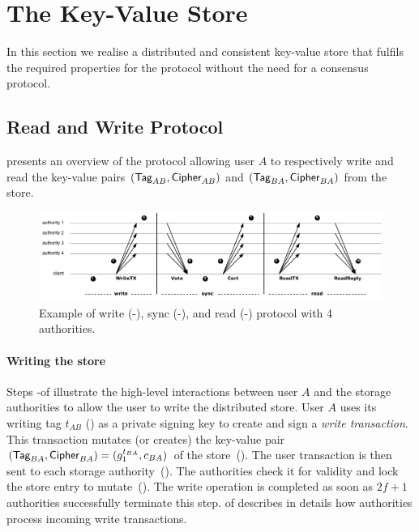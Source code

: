 \section{The \sysname Key-Value Store}
\label{sec:store}

In this section we realise a distributed and consistent key-value store that fulfils the required properties for the \sysname protocol without the need for a consensus protocol.


\subsection{Read and Write Protocol} \label{sec:read-write}
 presents an overview of the protocol allowing user $A$ to respectively write and read the key-value pairs $(\textsf{Tag}_{AB}, \textsf{Cipher}_{AB})$ and $(\textsf{Tag}_{BA}, \textsf{Cipher}_{BA})$ from the store.

\begin{figure}[t]
    \includegraphics[width=\textwidth]{figures/arke-store.drawio.pdf}
    \caption{Example of \sysname write (\one-\three), sync (\four-\seven), and read (\eight-\ten) protocol with 4 authorities.}
    \Description{}
    \label{fig:arke-store}
\end{figure}

\paragraph{Writing the store}
Steps \one-\three of  illustrate the high-level interactions between user $A$ and the storage authorities to allow the user to write the distributed store.
%
User $A$ uses its writing tag $t_{AB}$ () as a private signing key to create and sign a \emph{write transaction}. This transaction mutates (or creates) the key-value pair $(\textsf{Tag}_{BA}, \textsf{Cipher}_{BA}) = (g_1^{t_{BA}}, c_{BA})$ of the \sysname store~(\one).
%
The user transaction is then sent to each \sysname storage authority~(\two).
%
The authorities check it for validity and lock the store entry to mutate~(\three). The write operation is completed as soon as $2f+1$ authorities successfully terminate this step.  of  describes in details how authorities process incoming write transactions.

